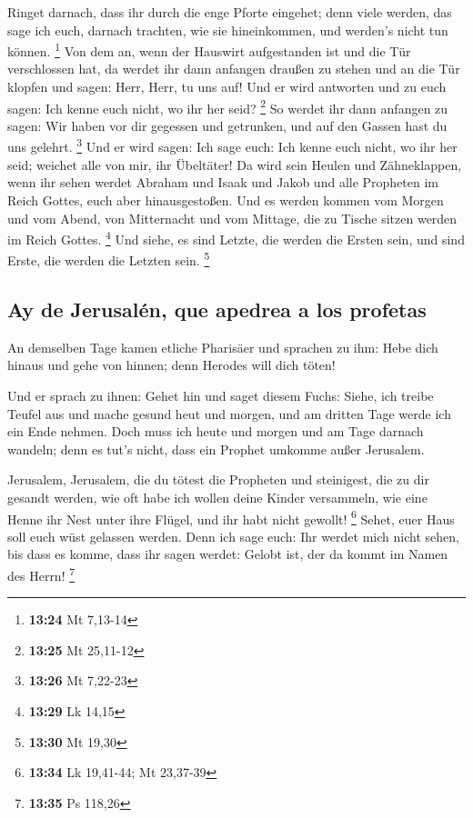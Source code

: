  Ringet darnach, dass ihr durch die enge Pforte eingehet;
denn viele werden, das sage ich euch, darnach trachten, wie sie
hineinkommen, und werden's nicht tun können. \footnote{\textbf{13:24} Mt
  7,13-14}  Von dem an, wenn der Hauswirt aufgestanden
ist und die Tür verschlossen hat, da werdet ihr dann anfangen draußen zu
stehen und an die Tür klopfen und sagen: Herr, Herr, tu uns auf! Und er
wird antworten und zu euch sagen: Ich kenne euch nicht, wo ihr her seid?
\footnote{\textbf{13:25} Mt 25,11-12}  So werdet ihr dann
anfangen zu sagen: Wir haben vor dir gegessen und getrunken, und auf den
Gassen hast du uns gelehrt. \footnote{\textbf{13:26} Mt 7,22-23}
 Und er wird sagen: Ich sage euch: Ich kenne euch nicht,
wo ihr her seid; weichet alle von mir, ihr Übeltäter!  Da
wird sein Heulen und Zähneklappen, wenn ihr sehen werdet Abraham und
Isaak und Jakob und alle Propheten im Reich Gottes, euch aber
hinausgestoßen.  Und es werden kommen vom Morgen und vom
Abend, von Mitternacht und vom Mittage, die zu Tische sitzen werden im
Reich Gottes. \footnote{\textbf{13:29} Lk 14,15}  Und
siehe, es sind Letzte, die werden die Ersten sein, und sind Erste, die
werden die Letzten sein. \footnote{\textbf{13:30} Mt 19,30}

\hypertarget{ay-de-jerusaluxe9n-que-apedrea-a-los-profetas}{%
\subsection{Ay de Jerusalén, que apedrea a los
profetas}\label{ay-de-jerusaluxe9n-que-apedrea-a-los-profetas}}

 An demselben Tage kamen etliche Pharisäer und sprachen
zu ihm: Hebe dich hinaus und gehe von hinnen; denn Herodes will dich
töten!

 Und er sprach zu ihnen: Gehet hin und saget diesem
Fuchs: Siehe, ich treibe Teufel aus und mache gesund heut und morgen,
und am dritten Tage werde ich ein Ende nehmen.  Doch muss
ich heute und morgen und am Tage darnach wandeln; denn es tut's nicht,
dass ein Prophet umkomme außer Jerusalem.

 Jerusalem, Jerusalem, die du tötest die Propheten und
steinigest, die zu dir gesandt werden, wie oft habe ich wollen deine
Kinder versammeln, wie eine Henne ihr Nest unter ihre Flügel, und ihr
habt nicht gewollt! \footnote{\textbf{13:34} Lk 19,41-44; Mt 23,37-39}
 Sehet, euer Haus soll euch wüst gelassen werden. Denn
ich sage euch: Ihr werdet mich nicht sehen, bis dass es komme, dass ihr
sagen werdet: Gelobt ist, der da kommt im Namen des Herrn! \footnote{\textbf{13:35}
  Ps 118,26}

